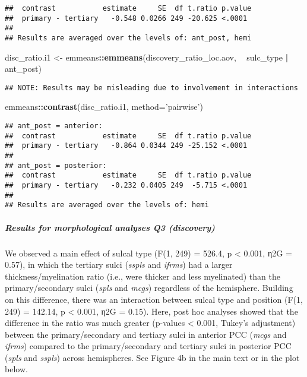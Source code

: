 \documentclass[
]{article}
\newenvironment{Shaded}{\begin{snugshade}}{\end{snugshade}}
\newcommand{\DataTypeTok}[1]{\textcolor[rgb]{0.13,0.29,0.53}{#1}}
\newcommand{\KeywordTok}[1]{\textcolor[rgb]{0.13,0.29,0.53}{\textbf{#1}}}
\newcommand{\NormalTok}[1]{#1}
\newcommand{\OperatorTok}[1]{\textcolor[rgb]{0.81,0.36,0.00}{\textbf{#1}}}
\newcommand{\StringTok}[1]{\textcolor[rgb]{0.31,0.60,0.02}{#1}}
\begin{document}
\begin{verbatim}
##  contrast           estimate     SE  df t.ratio p.value
##  primary - tertiary   -0.548 0.0266 249 -20.625 <.0001 
## 
## Results are averaged over the levels of: ant_post, hemi
\end{verbatim}

\begin{Shaded}
\begin{Highlighting}[]
\NormalTok{disc_ratio.i1 <-}\StringTok{ }\NormalTok{emmeans}\OperatorTok{::}\KeywordTok{emmeans}\NormalTok{(discovery_ratio_loc.aov, }\OperatorTok{~}\StringTok{ }\NormalTok{sulc_type }\OperatorTok{|}\StringTok{ }\NormalTok{ant_post)}
\end{Highlighting}
\end{Shaded}

\begin{verbatim}
## NOTE: Results may be misleading due to involvement in interactions
\end{verbatim}

\begin{Shaded}
\begin{Highlighting}[]
\NormalTok{emmeans}\OperatorTok{::}\KeywordTok{contrast}\NormalTok{(disc_ratio.i1, }\DataTypeTok{method=}\StringTok{'pairwise'}\NormalTok{)}
\end{Highlighting}
\end{Shaded}

\begin{verbatim}
## ant_post = anterior:
##  contrast           estimate     SE  df t.ratio p.value
##  primary - tertiary   -0.864 0.0344 249 -25.152 <.0001 
## 
## ant_post = posterior:
##  contrast           estimate     SE  df t.ratio p.value
##  primary - tertiary   -0.232 0.0405 249  -5.715 <.0001 
## 
## Results are averaged over the levels of: hemi
\end{verbatim}

\hypertarget{results-for-morphological-analyses-q3-discovery}{%
\subparagraph{Results for morphological analyses Q3
(discovery)}\label{results-for-morphological-analyses-q3-discovery}}

We observed a main effect of sulcal type (F(1, 249) = 526.4, p
\textless{} 0.001, η2G = 0.57), in which the tertiary sulci
(\emph{sspls} and \emph{ifrms}) had a larger thickness/myelination ratio
(i.e., were thicker and less myelinated) than the primary/secondary
sulci (\emph{spls} and \emph{mcgs}) regardless of the hemisphere.
Building on this difference, there was an interaction between sulcal
type and position (F(1, 249) = 142.14, p \textless{} 0.001, η2G = 0.15).
Here, post hoc analyses showed that the difference in the ratio was much
greater (p-values \textless{} 0.001, Tukey's adjustment) between the
primary/secondary and tertiary sulci in anterior PCC (\emph{mcgs} and
\emph{ifrms}) compared to the primary/secondary and tertiary sulci in
posterior PCC (\emph{spls} and \emph{sspls}) across hemispheres. See
Figure 4b in the main text or in the plot below.
\end{document}
